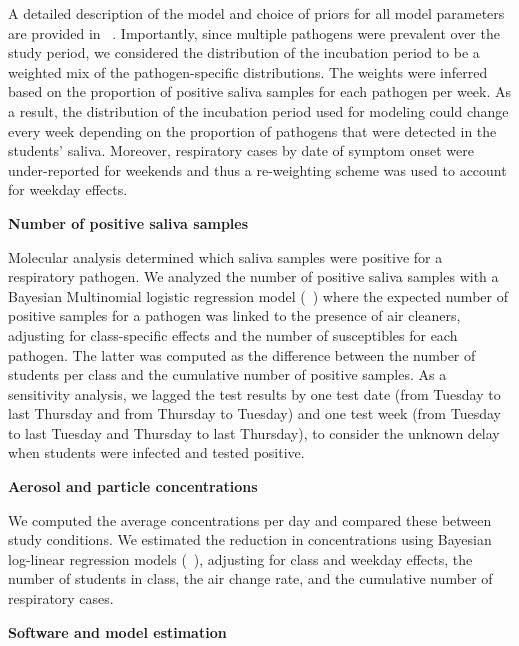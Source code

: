 \documentclass[fleqn,11pt]{wlscirep}
\begin{document}
A detailed description of the model and choice of priors for all model parameters are provided in \supp~. Importantly, since multiple pathogens were prevalent over the study period, we considered the distribution of the incubation period to be a weighted mix of the pathogen-specific distributions. The weights were inferred based on the proportion of positive saliva samples for each pathogen per week. As a result, the distribution of the incubation period used for modeling could change every week depending on the proportion of pathogens that were detected in the students' saliva. Moreover, respiratory cases by date of symptom onset were under-reported for weekends and thus a re-weighting scheme was used to account for weekday effects. \medskip

\noindent\textbf{Number of positive saliva samples} \smallskip

\noindent Molecular analysis determined which saliva samples were positive for a respiratory pathogen. We analyzed the number of positive saliva samples with a Bayesian Multinomial logistic regression model (\supp~) where the expected number of positive samples for a pathogen was linked to the presence of air cleaners, adjusting for class-specific effects and the number of susceptibles for each pathogen. The latter was computed as the difference between the number of students per class and the cumulative number of positive samples. As a sensitivity analysis, we lagged the test results by one test date (\ie from Tuesday to last Thursday and from Thursday to Tuesday) and one test week (\ie from Tuesday to last Tuesday and Thursday to last Thursday), to consider the unknown delay when students were infected and tested positive. 

\noindent\textbf{Aerosol and particle concentrations} \smallskip

\noindent We computed the average concentrations per day and compared these between study conditions. We estimated the reduction in concentrations using Bayesian log-linear regression models (\supp~), adjusting for class and weekday effects, the number of students in class, the air change rate, and the cumulative number of respiratory cases. \medskip


\noindent\textbf{Software and model estimation} \smallskip
\end{document}
